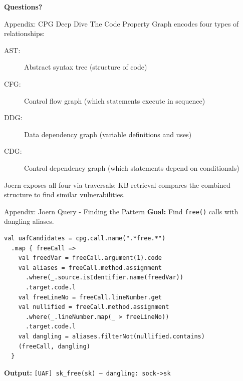 \documentclass[aspectratio=169,10pt]{beamer}
\begin{document}
\begin{frame}[plain]
\centering
\vspace{3em}
{\LARGE\bfseries\color{c1} Questions?}\\[2em]
\end{frame}
\begin{frame}{Appendix: CPG Deep Dive}
  The Code Property Graph encodes four types of relationships:

  \vspace{0.5cm}
  \begin{description}
    \item[AST:] Abstract syntax tree (structure of code)
    \item[CFG:] Control flow graph (which statements execute in sequence)
    \item[DDG:] Data dependency graph (variable definitions and uses)
    \item[CDG:] Control dependency graph (which statements depend on conditionals)
  \end{description}

  \vspace{0.5cm}

  \vspace{0.5cm}
  Joern exposes all four via traversals; KB retrieval compares the combined structure to find similar vulnerabilities.
\end{frame}

\begin{frame}[fragile]{Appendix: Joern Query - Finding the Pattern}
  \textbf{Goal:} Find \texttt{free()} calls with dangling aliases.

  \vspace{0.15cm}
  \tiny
  \begin{verbatim}
val uafCandidates = cpg.call.name(".*free.*")
  .map { freeCall =>
    val freedVar = freeCall.argument(1).code
    val aliases = freeCall.method.assignment
      .where(_.source.isIdentifier.name(freedVar))
      .target.code.l
    val freeLineNo = freeCall.lineNumber.get
    val nullified = freeCall.method.assignment
      .where(_.lineNumber.map(_ > freeLineNo))
      .target.code.l
    val dangling = aliases.filterNot(nullified.contains)
    (freeCall, dangling)
  }
  \end{verbatim}

  \normalsize
  \textbf{Output:} \texttt{[UAF] sk\_free(sk) — dangling: sock->sk}
\end{frame}
\end{document}
